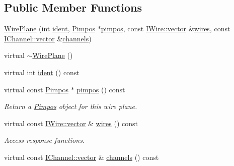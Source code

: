 \subsection*{Public Member Functions}
\begin{DoxyCompactItemize}
\item 
\hyperlink{class_wire_cell_1_1_gen_1_1_wire_plane_a64a8d50a3e32e246387afc1afec6b3af}{Wire\+Plane} (int \hyperlink{class_wire_cell_1_1_gen_1_1_wire_plane_ab043322069a1487486a32e0744897357}{ident}, \hyperlink{class_wire_cell_1_1_pimpos}{Pimpos} $\ast$\hyperlink{class_wire_cell_1_1_gen_1_1_wire_plane_adb80d740c4f245ae7fa6b26ccd539685}{pimpos}, const \hyperlink{class_wire_cell_1_1_i_data_ae1a9f863380499bb43f39fabb6276660}{I\+Wire\+::vector} \&\hyperlink{class_wire_cell_1_1_gen_1_1_wire_plane_aabd90e5ca70c31d41015980d7f320abe}{wires}, const \hyperlink{class_wire_cell_1_1_i_data_ae1a9f863380499bb43f39fabb6276660}{I\+Channel\+::vector} \&\hyperlink{class_wire_cell_1_1_gen_1_1_wire_plane_aa338b325c5266d901cd8d9656aa025c0}{channels})
\item 
virtual \hyperlink{class_wire_cell_1_1_gen_1_1_wire_plane_ab2481388fc7fe04f367a34f92350851f}{$\sim$\+Wire\+Plane} ()
\item 
virtual int \hyperlink{class_wire_cell_1_1_gen_1_1_wire_plane_ab043322069a1487486a32e0744897357}{ident} () const
\item 
virtual const \hyperlink{class_wire_cell_1_1_pimpos}{Pimpos} $\ast$ \hyperlink{class_wire_cell_1_1_gen_1_1_wire_plane_adb80d740c4f245ae7fa6b26ccd539685}{pimpos} () const
\begin{DoxyCompactList}\small\item\em Return a \hyperlink{class_wire_cell_1_1_pimpos}{Pimpos} object for this wire plane. \end{DoxyCompactList}\item 
virtual const \hyperlink{class_wire_cell_1_1_i_data_ae1a9f863380499bb43f39fabb6276660}{I\+Wire\+::vector} \& \hyperlink{class_wire_cell_1_1_gen_1_1_wire_plane_aabd90e5ca70c31d41015980d7f320abe}{wires} () const
\begin{DoxyCompactList}\small\item\em Access response functions. \end{DoxyCompactList}\item 
virtual const \hyperlink{class_wire_cell_1_1_i_data_ae1a9f863380499bb43f39fabb6276660}{I\+Channel\+::vector} \& \hyperlink{class_wire_cell_1_1_gen_1_1_wire_plane_aa338b325c5266d901cd8d9656aa025c0}{channels} () const
\end{DoxyCompactItemize}
